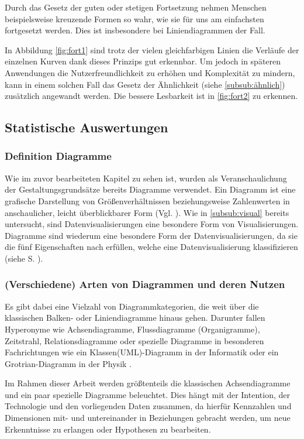 Durch das Gesetz der guten oder stetigen Fortsetzung nehmen Menschen beispielsweise kreuzende Formen so wahr, wie sie für uns am einfachsten fortgesetzt werden.
Dies ist insbesondere bei Liniendiagrammen der Fall.

In Abbildung \ref{fig:fort1} sind trotz der vielen gleichfarbigen Linien die Verläufe der einzelnen Kurven dank dieses Prinzips gut erkennbar.
Um jedoch in späteren Anwendungen die Nutzerfreundlichkeit zu erhöhen und Komplexität zu mindern, kann in einem solchen Fall das Gesetz der Ähnlichkeit (siehe \ref{subsub:ähnlich}) zusätzlich angewandt werden.
Die bessere Lesbarkeit ist in \ref{fig:fort2} zu erkennen.

\subsection{Statistische Auswertungen}
\subsubsection{Definition Diagramme}
Wie im zuvor bearbeiteten Kapitel zu sehen ist, wurden als Veranschaulichung der Gestaltungsgrundsätze bereits Diagramme verwendet.
Ein Diagramm ist \glqq eine grafische Darstellung von Größenverhältnissen beziehungsweise Zahlenwerten in anschaulicher, leicht überblickbarer Form\grqq{} (Vgl. \cite{Dudenredaktion.2015}).
Wie in \ref{subsub:visual} bereits untersucht, sind Datenvisualisierungen eine besondere Form von Visualisierungen.
Diagramme sind wiederum eine besondere Form der Datenvisualisierungen, da sie die fünf Eigenschaften nach \cite{Card.2007} erfüllen, welche eine Datenvisualisierung klassifizieren (siehe S. \pageref{subsub:visual}). 

\subsubsection{(Verschiedene) Arten von Diagrammen und deren Nutzen}
Es gibt dabei eine Vielzahl von Diagrammkategorien, die weit über die klassischen Balken- oder Liniendiagramme hinaus gehen.
Darunter fallen Hyperonyme wie Achsendiagramme, Flussdiagramme (Organigramme), Zeitstrahl, Relationsdiagramme oder spezielle Diagramme in besonderen Fachrichtungen wie ein Klassen(UML)-Diagramm in der Informatik oder ein Grotrian-Diagramm in der Physik \cite{Duncan.2018, Bounford.2001, Engels.2015}.

Im Rahmen dieser Arbeit werden größtenteils die klassischen Achsendiagramme und ein paar spezielle Diagramme beleuchtet.
Dies hängt mit der Intention, der Technologie und den vorliegenden Daten zusammen, da hierfür Kennzahlen und Dimensionen mit- und untereinander in Beziehungen gebracht werden, um neue Erkenntnisse zu erlangen oder Hypothesen zu bearbeiten.


